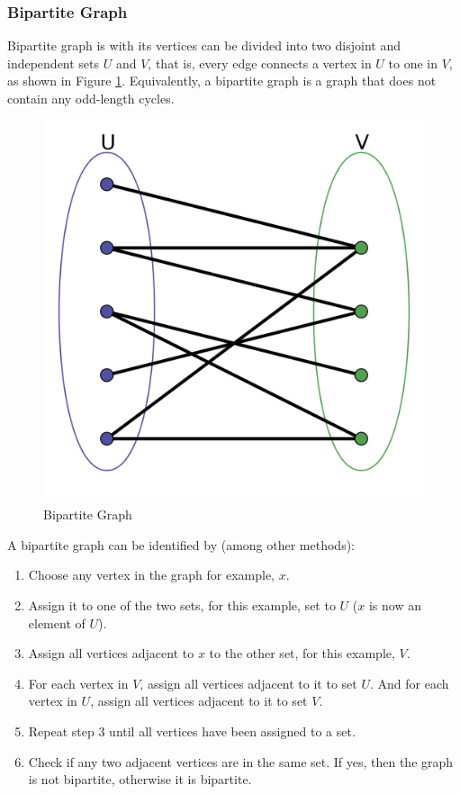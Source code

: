 \documentclass{article}
\theoremstyle{plain}%
\theoremstyle{definition}
\theoremstyle{remark}
\begin{document}
	\subsubsection{Bipartite Graph}

	Bipartite graph is with its vertices can be divided into two disjoint and independent sets $U$ and $V$, that is, every edge connects a vertex in $U$ to one in $V$, as shown in Figure \ref{fig-bipartite}. Equivalently, a bipartite graph is a graph that does not contain any odd-length cycles.

	\begin{figure}[htbp]
		\center
		\includegraphics[scale=0.1]{img/bipartite-graph.png}
		\caption{Bipartite Graph}
		\label{fig-bipartite}
	\end{figure}

	A bipartite graph can be identified by (among other methods):
	\begin{enumerate}
		\item Choose any vertex in the graph for example, $x$.
		\item Assign it to one of the two sets, for this example, set to $U$ ($x$ is now an element of $U$).
		\item Assign all vertices adjacent to $x$ to the other set, for this example, $V$.
		\item For each vertex in $V$, assign all vertices adjacent to it to set $U$. And for each vertex in $U$, assign all vertices adjacent to it to set $V$.
		\item Repeat step 3 until all vertices have been assigned to a set.
		\item Check if any two adjacent vertices are in the same set. If yes, then the graph is not bipartite, otherwise it is bipartite.
	\end{enumerate}
\end{document}

